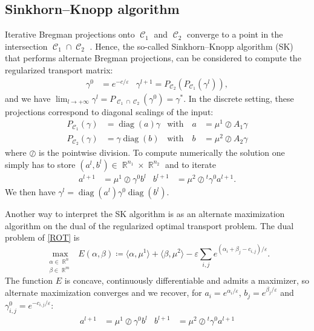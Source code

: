 \documentclass{article} %
\DeclareMathOperator{\IR}{\mathbb{R}}
\DeclareMathOperator{\Ccal}{\mathcal{C}}
\DeclareMathOperator{\diag}{diag}
\renewcommand{\epsilon}{\varepsilon}
\theoremstyle{plain}
\theoremstyle{definition}
\theoremstyle{remark}
\begin{document}
\subsection{Sinkhorn--Knopp algorithm}
Iterative Bregman projections onto $\Ccal_1$ and $\Ccal_2$ converge to a point in the intersection $\Ccal_1 \cap \Ccal_2$ \cite{bregman67}. Hence, the so-called Sinkhorn--Knopp algorithm (SK) \cite{sinkhorn64} that performs alternate Bregman projections, can be considered to compute the regularized  transport matrix:
\begin{align*}
\gamma^0 &= e^{-c/\epsilon} &
\gamma^{l+1} = P_{\Ccal_2}(P_{\Ccal_1}(\gamma^l)),
\end{align*}
and we have 
$\lim_{l\rightarrow +\infty} \gamma^l = P_{\Ccal_1 \cap \Ccal_2}(\gamma^0) = \gamma^*.$
%
In the discrete setting, these projections correspond to diagonal scalings of the input:
\begin{align}\label{scaling}
P_{\Ccal_1}(\gamma) &= \diag(a) \gamma &\text{with}\quad
a &=  {\mu^1}\oslash{A_1 \gamma} \\
P_{\Ccal_2}(\gamma) &= \gamma \diag(b) &\text{with}\quad
b &= {\mu^2}\oslash{A_2 \gamma}\nonumber
\end{align}
where $\oslash$ is the pointwise division. 
To compute numerically the solution one simply has to store $(a^l, b^l)\in\IR^{n_1}\times \IR^{n_2}$ and to iterate
\begin{align*}
a^{l+1} &= {\mu^1}\oslash{\gamma^0 b^l} &
b^{l+1} &= {\mu^2}\oslash{^t \gamma^0 a^{l+1}} .
\end{align*}
We then have $\gamma^l = \diag(a^l) \gamma^0 \diag(b^l).$ 

Another way to interpret the SK algorithm is as an alternate maximization algorithm on the dual of the regularized optimal transport problem. The dual problem of \eqref{ROT} is
\begin{equation}\label{DROT}
\max_{\substack{\alpha\in \IR^n\\\beta\in \IR^m}}\; E(\alpha,\beta) \coloneqq \langle \alpha,\mu^1\rangle+\langle \beta,\mu^2\rangle-\epsilon\sum_{i,j}e^{(\alpha_i+\beta_j-c_{i,j})/\epsilon}.
\end{equation}
The function $E$ is concave, continuously differentiable and admits a maximizer, so alternate maximization converges and we recover, for $a_i=e^{\alpha_i/\epsilon}$, $b_j=e^{\beta_j/\epsilon}$ and $\gamma^0_{i,j}=e^{-c_{i,j}/\epsilon}$:
\begin{align*}
a^{l+1} &= {\mu^1}\oslash{\gamma^0 b^l} &
b^{l+1} &= {\mu^2}\oslash{^t \gamma^0 a^{l+1}} 
\end{align*}
\end{document}
